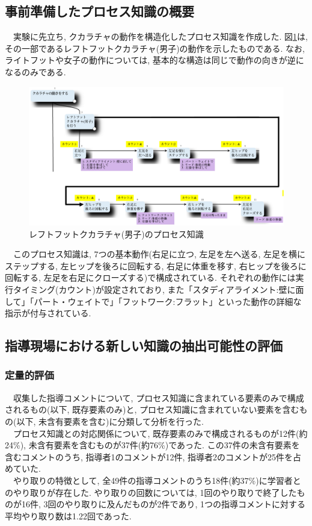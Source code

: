 \subsection{事前準備したプロセス知識の概要}
　実験に先立ち, クカラチャの動作を構造化したプロセス知識を作成した. 図\ref{fig:process_knowledge_base}は, その一部であるレフトフットクカラチャ(男子)の動作を示したものである. なお, ライトフットや女子の動作については, 基本的な構造は同じで動作の向きが逆になるのみである.\\

\begin{figure}[htbp]
    \centering
    \includegraphics[width=1.0\linewidth]{./image/process_knowledge_base.png}
    \caption{レフトフットクカラチャ(男子)のプロセス知識}
    \label{fig:process_knowledge_base}
\end{figure}

　このプロセス知識は, 7つの基本動作(右足に立つ, 左足を左へ送る, 左足を横にステップする, 左ヒップを後ろに回転する, 右足に体重を移す, 右ヒップを後ろに回転する, 左足を右足にクローズする)で構成されている. それぞれの動作には実行タイミング(カウント)が設定されており, また「スタディアライメント:壁に面して」「パート・ウェイトで」「フットワーク:フラット」といった動作の詳細な指示が付与されている.\\



\subsection{指導現場における新しい知識の抽出可能性の評価}
\subsubsection{定量的評価}
　収集した指導コメントについて, プロセス知識に含まれている要素のみで構成されるもの(以下, 既存要素のみ)と, プロセス知識に含まれていない要素を含むもの(以下, 未含有要素を含む)に分類して分析を行った.\\
　プロセス知識との対応関係について, 既存要素のみで構成されるものが12件(約24\%), 未含有要素を含むものが37件(約76\%)であった. この37件の未含有要素を含むコメントのうち, 指導者1のコメントが12件, 指導者2のコメントが25件を占めていた.\\
　やり取りの特徴として, 全49件の指導コメントのうち18件(約37\%)に学習者とのやり取りが存在した. やり取りの回数については, 1回のやり取りで終了したものが16件, 3回のやり取りに及んだものが2件であり, 1つの指導コメントに対する平均やり取り数は1.22回であった.\\


